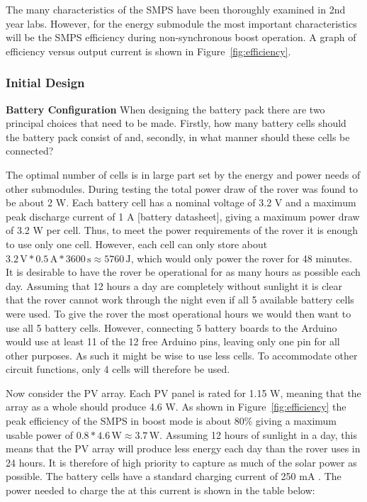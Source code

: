 \documentclass[a4paper]{article}
\newcommand{\unit}[1]{\ensuremath{\, \mathrm{#1}}}
\begin{document}
The many characteristics of the SMPS have been thoroughly examined in 
2nd year labs. However, for the energy submodule the most important characteristics 
will be the SMPS efficiency during non-synchronous boost operation. A graph of 
efficiency versus output current is shown in Figure~\ref{fig:efficiency}.


\subsubsection{Initial Design}

\textbf{Battery Configuration}
\vspace{10pt} 
\newline
When designing the battery pack there are two principal choices that need to be made. 
Firstly, how many battery cells should the battery pack consist of and, secondly, 
in what manner should these cells be connected? 

The optimal number of cells is in large part set by the energy 
and power needs of other submodules. During testing the total power 
draw of the rover was found to be about 2 W. Each battery cell has a 
nominal voltage of 3.2 V and a maximum peak discharge current of 1 A 
[battery datasheet], giving a maximum power draw of 3.2 W per cell. 
Thus, to meet the power requirements of the rover it is enough to use only 
one cell. However, each cell can only store about \(3.2 \unit{V} * 0.5 \unit{A} * 3600 \unit{s} \approx 5760 \unit{J} \), 
which would only power the rover for 48 minutes. It is desirable to have 
the rover be operational for as many hours as possible each day. 
Assuming that 12 hours a day are completely without sunlight it is clear 
that the rover cannot work through the night even if all 5 available 
battery cells were used. To give the rover the most operational hours we 
would then want to use all 5 battery cells. However, connecting 5 battery 
boards to the Arduino would use at least 11 of the 12 free Arduino pins, 
leaving only one pin for all other purposes. As such it might be wise to use 
less cells. To accommodate other circuit functions, only 4 cells will therefore be used.

Now consider the PV array. Each PV panel is rated for 1.15 W, meaning 
that the array as a whole should produce 4.6 W. As shown in Figure~\ref{fig:efficiency} the 
peak efficiency of the SMPS in boost mode is about 80\% giving a maximum 
usable power of \(0.8 * 4.6 \unit{W} \approx 3.7 \unit{W} \). Assuming 12 hours of sunlight in a day, 
this means that the PV array will produce less energy each day than the rover 
uses in 24 hours. It is therefore of high priority to capture as much of the 
solar power as possible. The battery cells have a standard charging current of 
250 mA \cite{batteryDatasheet}. The power needed to charge the at this current is 
shown in the table below:
\end{document}
